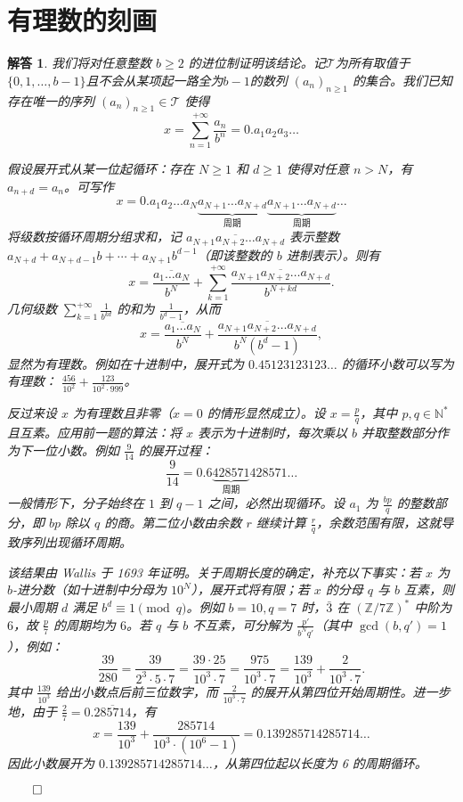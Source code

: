 \documentclass[12pt,UTF8]{ctexbook}
\theoremstyle{exercisestyle}
\theoremstyle{solutionstyle}
\newtheorem*{solution*}{解答}
\newenvironment{solution}
  {\begin{solution*}}
  {\hfill\ensuremath{\qed}\end{solution*}}
\begin{document}
\section{有理数的刻画}\label{caractérisation-des-rationnels}
\begin{solution}
我们将对任意整数 $b \geqslant 2$ 的进位制证明该结论。记$\mathcal T$为所有取值于$\{0,1,\ldots,b-1\}$且不会从某项起一路全为$b-1$的数列 $(a_n)_{n\geq 1}$ 的集合。我们已知存在唯一的序列 $(a_n)_{n\geq 1} \in \mathcal{T}$ 使得
$$
x = \sum_{n=1}^{+\infty} \frac{a_n}{b^n} = 0.a_1 a_2 a_3 \dots
$$

\begin{subquestions}
\item 假设展开式从某一位起循环：存在 $N \geq 1$ 和 $d \geq 1$ 使得对任意 $n > N$，有 $a_{n+d} = a_n$。可写作
$$
x = 0.a_1 a_2 \dots a_N \underbrace{a_{N+1} \dots a_{N+d}}_{\text{周期}} \underbrace{a_{N+1} \dots a_{N+d}}_{\text{周期}} \dots
$$
将级数按循环周期分组求和，记 $\overline{a_{N+1}a_{N+2}\ldots a_{N+d}}$ 表示整数 $a_{N+d} + a_{N+d-1}b + \cdots + a_{N+1}b^{d-1}$（即该整数的 $b$ 进制表示）。则有
$$
x = \frac{\overline{a_1 \dots a_N}}{b^N} + \sum_{k=1}^{+\infty} \frac{\overline{a_{N+1} a_{N+2} \dots a_{N+d}}}{b^{N+kd}}.
$$
几何级数 $\sum_{k=1}^{+\infty} \frac{1}{b^{kd}}$ 的和为 $\frac{1}{b^d-1}$，从而
$$
x = \frac{\overline{a_1 \dots a_N}}{b^N} + \frac{\overline{a_{N+1} a_{N+2} \dots a_{N+d}}}{b^N (b^d - 1)},
$$
显然为有理数。例如在十进制中，展开式为 $0.45123123123\ldots$ 的循环小数可以写为有理数： $\frac{456}{10^2} + \frac{123}{10^2 \cdot 999}$。

\item 反过来设 $x$ 为有理数且非零（$x=0$ 的情形显然成立）。设 $x = \frac{p}{q}$，其中 $p,q \in \mathbb{N}^*$ 且互素。应用前一题的算法：将 $x$ 表示为十进制时，每次乘以 $b$ 并取整数部分作为下一位小数。例如 $\frac{9}{14}$ 的展开过程：
$$
\frac{9}{14} = 0.6\underbrace{428571}_{\text{周期}}428571\dots
$$
一般情形下，分子始终在 $1$ 到 $q-1$ 之间，必然出现循环。设 $a_1$ 为 $\frac{bp}{q}$ 的整数部分，即 $bp$ 除以 $q$ 的商。第二位小数由余数 $r$ 继续计算 $\frac{r}{q}$，余数范围有限，这就导致序列出现循环周期。
\end{subquestions}

该结果由 Wallis 于 1693 年证明。关于周期长度的确定，补充以下事实：若 $x$ 为 $b$-进分数（如十进制中分母为 $10^N$），展开式将有限；若 $x$ 的分母 $q$ 与 $b$ 互素，则最小周期 $d$ 满足 $b^d \equiv 1 \pmod{q}$。例如 $b=10,q=7$ 时，$\bar{3}$ 在 $(\mathbb{Z}/7\mathbb{Z})^*$ 中阶为 $6$，故 $\frac{p}{7}$ 的周期均为 $6$。若 $q$ 与 $b$ 不互素，可分解为 $\frac{p'}{b^Nq'}$（其中 $\gcd(b,q')=1$），例如：
$$
\frac{39}{280} = \frac{39}{2^3 \cdot 5 \cdot 7} = \frac{39 \cdot 25}{10^3 \cdot 7} = \frac{975}{10^3 \cdot 7} = \frac{139}{10^3} + \frac{2}{10^3 \cdot 7}.
$$
其中 $\frac{139}{10^3}$ 给出小数点后前三位数字，而 $\frac{2}{10^3 \cdot 7}$ 的展开从第四位开始周期性。进一步地，由于 $\frac{2}{7} = 0.\overline{285714}$，有
$$
x = \frac{139}{10^3} + \frac{285714}{10^3 \cdot (10^6 - 1)} = 0.139285714285714\ldots
$$
因此小数展开为 $0.139285714285714\ldots$，从第四位起以长度为 6 的周期循环。


\end{solution}
\end{document}
